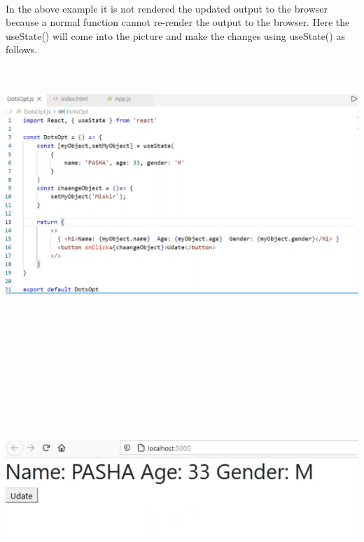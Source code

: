 \documentclass{article}
\begin{document}
\noindent 
\newpage
\noindent \\
In the above example it is not rendered the updated output to the browser because a normal function cannot re-render the output to the browser.  Here the useState() will come into the picture and make the changes using useState() as follows.

\noindent 

\noindent 

\noindent 

\noindent 

\begin{center}
	\noindent \includegraphics*[width=6.21in, height=3.78in]{IMG-10-03}
\end{center}
\noindent \\
\begin{center}
	\noindent \includegraphics*[width=6.25in, height=3.90in]{IMG-10-04}
\end{center}
\end{document}

